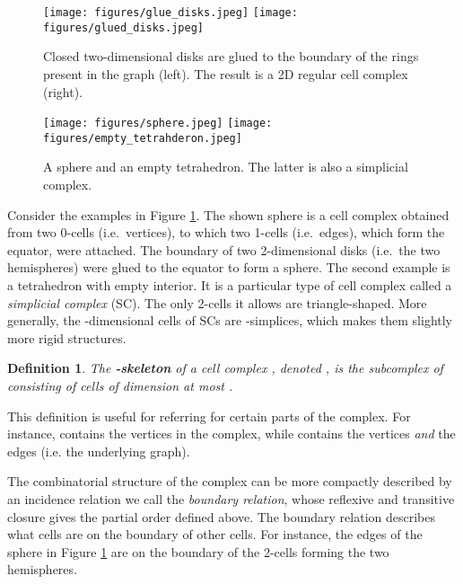 \documentclass{article}
\newtheorem{definition}[theorem]{Definition}
\begin{document}
\begin{figure}
    \centering
     \begin{minipage}{.63\textwidth}
         \texttt{[image: figures/glue\_disks.jpeg]}
         \hfill
         \texttt{[image: figures/glued\_disks.jpeg]}
         \caption{Closed two-dimensional disks are glued to the boundary of the rings present in the graph (left). The result is a 2D regular cell complex (right).}
        \label{fig:gluing}
     \end{minipage}
     \hfill
     \begin{minipage}{0.33\textwidth}
         \centering
         \texttt{[image: figures/sphere.jpeg]}
\hspace{10pt}
         \texttt{[image: figures/empty\_tetrahderon.jpeg]}
         \caption{A sphere and an empty tetrahedron. The latter is also a simplicial complex.}
        \label{fig:1}
     \end{minipage}
     \vspace{-10pt}
\end{figure}

Consider the examples in Figure \ref{fig:1}. The shown sphere is a cell complex obtained from  two 0-cells (i.e.\ vertices), to which two 1-cells (i.e.\ edges), which form the equator, were attached. The boundary of two 2-dimensional disks (i.e.\ the two hemispheres) were glued to the equator to form a sphere. The second example is a tetrahedron with empty interior. It is a particular type of cell complex called a \emph{simplicial complex} (SC). The only 2-cells it allows are triangle-shaped. More generally, the -dimensional cells of SCs are -simplices, which makes them slightly more rigid structures.



\begin{definition}
The \textbf{-skeleton} of a cell complex , denoted , is the subcomplex of  consisting of cells of dimension at most .
\end{definition}

This definition is useful for referring for certain parts of the complex. For instance,  contains the vertices in the complex, while  contains the vertices \emph{and} the edges (i.e. the underlying graph). 

The combinatorial structure of the complex can be more compactly described by an incidence relation we call the \emph{boundary relation}, whose reflexive and transitive closure gives the partial order defined above. The boundary relation describes what cells are on the boundary of other cells. For instance, the edges of the sphere in Figure \ref{fig:1} are on the boundary of the 2-cells forming the two hemispheres. 
\end{document}

